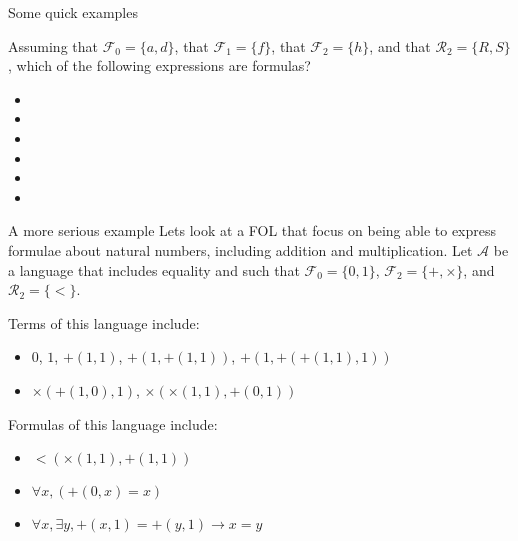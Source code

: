 \documentclass[aspectratio=169]{beamer}
\begin{document}
\begin{slide}{Some quick examples}

Assuming that $\mathcal{F}_0 = \{a,d\}$, that $\mathcal{F}_1 = \{f\}$, that $\mathcal{F}_2 = \{h\}$, and that $\mathcal{R}_2 = \{R,S\}$, which of the following expressions are formulas?

\begin{itemize}
\item {}
\item {}
\item {}
\item {}
\item {}
\item {}
\end{itemize}

\end{slide}

\begin{slide}{A more serious example}
  Lets look at a FOL that focus on being able to express formulae about natural numbers, including addition and multiplication. Let $\mathcal{A}$ be a language that includes equality and such that $\mathcal{F}_0 = \{0,1\}$, $\mathcal{F}_2 = \{+,\times\}$, and $\mathcal{R}_2 = \{<\}$.
  
  Terms of this language include:
  \begin{itemize}
  \item $0$, $1$, $+(1,1)$, $+(1,+(1,1))$, $+(1,+(+(1,1),1))$
  \item $\times(+(1,0),1)$, $\times(\times(1,1),+(0,1))$  
  \end{itemize}
  
  Formulas of this language include:
  \begin{itemize}
  \item $<(\times(1,1),+(1,1))$
  \item $\forall x, (+(0,x) = x)$
  \item $\forall x, \exists y, +(x,1) = +(y,1) \to x = y$  
  \end{itemize}


\end{slide}
\end{document}
